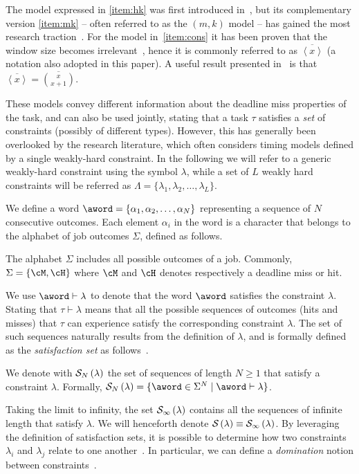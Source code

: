 The model expressed in \ref{item:hk} was first introduced in~\cite{Hamdaoui:1995}, but its complementary version \ref{item:mk} -- often referred to as the $(m,k)$ model -- has gained the most research traction~\cite{pazzaglia2020generalized, Hammadeh:2019, Natarajan:2019}.
For the model in~\ref{item:cons} it has been proven that the window size becomes irrelevant~\cite{Bernat:2001}, hence it is commonly referred to as $\overbar{\left<x\right>}$ (a notation also adopted in this paper).
A useful result presented in~\cite{Maggio:2020} is that $\overbar{\left<x\right>} = \overbar{\binom{x}{x+1}}$.

These models convey different information about the deadline miss properties of the task, and can also be used jointly, stating that a task $\tau$ satisfies a \emph{set} of constraints (possibly of different types).
However, this has generally been overlooked by the research literature, which often considers timing models defined by a single weakly-hard constraint.
%
In the following we will refer to a generic weakly-hard constraint using the symbol $\lambda$, while a set of $L$ weakly hard constraints will be referred as $\Lambda = \{ \lambda_1, \lambda_2, \dots, \lambda_L \}$.

We define a word $\aword= \{\alpha_1, \alpha_2, \dots, \alpha_N\}$ representing a sequence of $N$ consecutive outcomes.
Each element $\alpha_i$ in the word is a character that belongs to the alphabet of job outcomes $\Sigma$, defined as follows.

\begin{definition}%
    \label{def:basic-alphabet}%
    The alphabet $\Sigma$ includes all possible outcomes of a job.
    Commonly, $\Sigma = \{ \cM, \cH \}$ where $\cM$ and $\cH$ denotes respectively a deadline miss or hit.
\end{definition}

We use $\aword \vdash \lambda$ to denote that the word $\aword$ satisfies the constraint $\lambda$. 
Stating that $\tau \vdash \lambda$ means that all the possible sequences of outcomes (hits and misses) that $\tau$ can experience satisfy the corresponding constraint $\lambda$.
The set of such sequences naturally results from the definition of $\lambda$, and is formally defined as the \emph{satisfaction set} as follows~\cite{Bernat:2001}.

\begin{definition}%
    \label{def:satisfaction}%
    We denote with $\mathcal{S}_{N}\left( \lambda \right)$ the set of sequences of length $N \geq 1$ that satisfy a constraint $\lambda$.
    Formally, $\sset{N}{\lambda} = \{ \aword \in \Sigma^N \mid \aword \vdash \lambda \}$.
\end{definition}
Taking the limit to infinity, the set $\mathcal{S}_{\infty}\left( \lambda \right)$ contains all the sequences of infinite length that satisfy $\lambda$.
We will henceforth denote $\mathcal{S}_{}\left( \lambda \right) \equiv \mathcal{S}_{\infty}\left( \lambda \right)$.
%
By leveraging the definition of satisfaction sets, it is possible to determine how two constraints $\lambda_i$ and $\lambda_j$ relate to one another~\cite{Bernat:2001, Wu:2020}.
In particular, we can define a \emph{domination} notion between constraints~\cite{Bernat:2001}.

